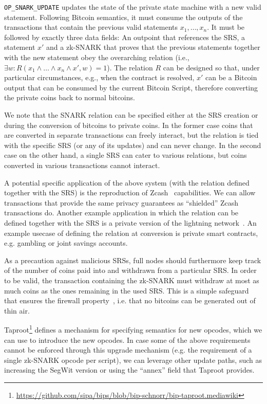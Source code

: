   \texttt{OP\_SNARK\_UPDATE} updates the state of the private state machine with
  a new valid statement. Following Bitcoin semantics, it must consume the
  outputs of the transactions that contain the previous valid statements $x_1,
  \dots, x_n$. It must be followed by exactly three data fields: An outpoint
  that references the SRS, a statement $x'$ and a zk-SNARK that proves that the
  previous statements together with the new statement obey the overarching
  relation (i.e., $\exists w: R(x_1 \wedge \dots \wedge x_n \wedge x', w) = 1$).
  The relation $R$ can be designed so that, under particular circumstances,
  e.g., when the contract is resolved, $x'$ can be a Bitcoin output that can be
  consumed by the current Bitcoin Script, therefore converting the private coins
  back to normal bitcoins.

  We note that the SNARK relation can be specified either at the SRS creation or
  during the conversion of bitcoins to private coins. In the former case coins
  that are converted in separate transactions can freely interact, but the
  relation is tied with the specific SRS (or any of its updates) and can never
  change. In the second case on the other hand, a single SRS can cater to
  various relations, but coins converted in various transactions cannot
  interact.

  A potential specific application of the above system (with the relation
  defined together with the SRS) is the reproduction of
  Zcash~\cite{DBLP:conf/sp/Ben-SassonCG0MTV14,zcash-protocol} capabilities. We
  can allow transactions that provide the same privacy guarantees as
  ``shielded'' Zcash transactions do. Another example application in which the
  relation can be defined together with the SRS is a private version of the
  lightning network~\cite{lightning}. An example usecase of defining the
  relation at conversion is private smart contracts, e.g. gambling or joint
  savings accounts.

  As a precaution against malicious SRSs, full nodes should furthermore keep
  track of the number of coins paid into and withdrawn from a particular SRS. In
  order to be valid, the transaction containing the zk-SNARK must withdraw at
  most as much coins as the ones remaining in the used SRS. This is a simple
  safeguard that ensures the firewall property~\cite{DBLP:conf/sp/GaziKZ19},
  i.e. that no bitcoins can be generated out of thin air.

  Taproot\footnote{\url{https://github.com/sipa/bips/blob/bip-schnorr/bip-taproot.mediawiki}}
  defines a mechanism for specifying semantics for new opcodes, which we can use
  to introduce the   new opcodes. In case some of the above requirements
  cannot be enforced through this upgrade mechanism (e.g. the requirement of a
  single zk-SNARK opcode per script), we can leverage other update paths, such
  as increasing the SegWit version or using the ``annex'' field that Taproot
  provides.

